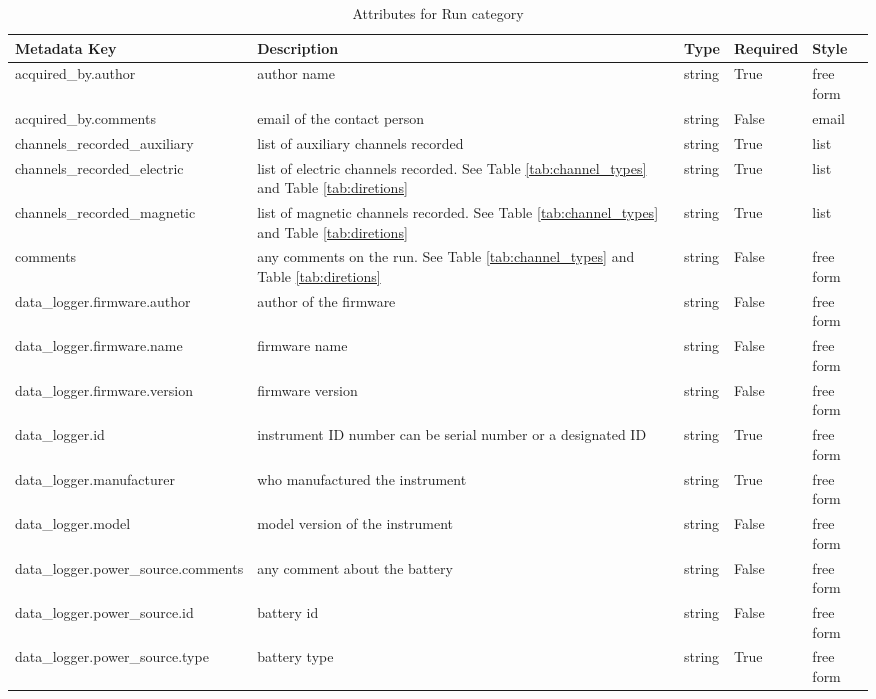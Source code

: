\documentclass[12pt]{article}
\begin{document}
\begin{table}[h!]
    \caption[Attributes for Run]{Attributes for Run category}
    \begin{tabular}{|l|p{2.55in}|l|l|p{.95in}|}
        \hline
       \textbf{Metadata Key} & \textbf{Description} & \textbf{Type} & \textbf{Required} & \textbf{Style}\\ \hline acquired\_by.author & author name & string & True & free form  \\ \hline
       acquired\_by.comments & email of the contact person & string & False & email  \\ \hline
       channels\_recorded\_auxiliary & list of auxiliary channels recorded & string & True & list  \\ \hline
       channels\_recorded\_electric & list of electric channels recorded. See Table \ref{tab:channel_types} and Table \ref{tab:diretions} & string & True & list  \\ \hline
       channels\_recorded\_magnetic & list of magnetic channels recorded. See Table \ref{tab:channel_types}  and Table \ref{tab:diretions} & string & True & list  \\ \hline
       comments & any comments on the run. See Table \ref{tab:channel_types}  and Table \ref{tab:diretions} & string & False & free form  \\ \hline
       data\_logger.firmware.author & author of the firmware & string & False & free form  \\ \hline
       data\_logger.firmware.name & firmware name & string & False & free form  \\ \hline
       data\_logger.firmware.version & firmware version & string & False & free form  \\ \hline
       data\_logger.id & instrument ID number can be serial number or a designated ID & string & True & free form  \\ \hline
       data\_logger.manufacturer & who manufactured the instrument & string & True & free form  \\ \hline
       data\_logger.model & model version of the instrument & string & False & free form  \\ \hline
       data\_logger.power\_source.comments & any comment about the battery & string & False & free form  \\ \hline
       data\_logger.power\_source.id & battery id & string & False & free form\\ \hline
       data\_logger.power\_source.type & battery type & string & True & free form  \\ \hline

\end{tabular}
\end{table}
\end{document}
